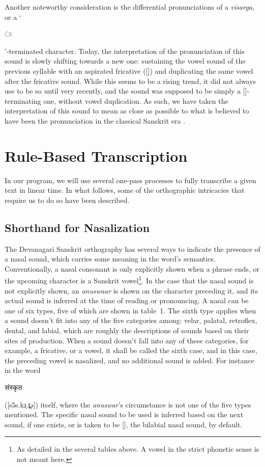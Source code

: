 \documentclass[10pt,a4paper]{article}
\let\ipa\textipa
\newcommand{\sansk}[1]{\begin{sanskrit}#1\end{sanskrit}}
\begin{document}
Another noteworthy consideration is the differential pronunciations of a {\it visarga}, or a `\sansk{ः}'-terminated character. Today, the interpretation of the pronunciation of this sound is slowly shifting towards a new one: sustaining the vowel sound of the previous syllable with an aspirated fricative ([{\it \ipa{h}}]) and duplicating the same vowel after the fricative sound. While this seems to be a rising trend, it did not always use to be so until very recently,  and the sound was supposed to be simply a {[\ipa{h}]}-terminating one, without vowel duplication. As such, we have taken the interpretation of this sound to mean as close as possible to what is believed to have been the pronunciation in the classical Sanskrit era \cite{zieba2002original,jamison2004sanskrit}.

\section{Rule-Based Transcription}

In our program, we will use several one-pass processes to fully transcribe a given text in linear time. In what follows, some of the orthographic intricacies that require us to do so have been described.

\subsection{Shorthand for Nasalization}

The Devanagari Sanskrit orthography has several ways to indicate the presence of a nasal sound, which carries some meaning in the word's semantics. Conventionally, a nasal consonant is only explicitly shown when a phrase ends, or the upcoming character is a Sanskrit vowel\footnote{As detailed in the several tables above. A vowel in the strict phonetic sense is not meant here.}. In the case that the nasal sound is not explicitly shown, an {\it anuswaar} is shown on the character preceding it, and its actual sound is inferred at the time of reading or pronouncing. A nasal can be one of six types, five of which are shown in table~1. The sixth type applies when a sound doesn't fit into any of the five categories among: velar, palatal, retroflex, dental, and labial, which are roughly the descriptions of sounds based on their sites of production. When a sound doesn't fall into any of these categories, for example, a fricative, or a vowel, it shall be called the sixth case, and in this case, the preceding vowel is nasalized, and no additional sound is added. For instance in the word \sansk{संस्कृत} ([sə̃̃s.kɹ̩.t̪ə]) itself, where the {\it anuswar}'s circumstance is not one of the five types mentioned. The specific nasal sound to be used is inferred based on the next sound, if one exists, or is taken to be {[\ipa{m}]}, the bilabial nasal sound, by default.
\end{document}
